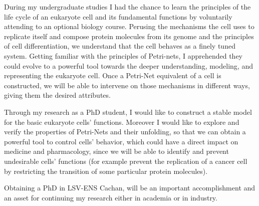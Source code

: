 \documentclass[a4paper,12pt]{article}
\begin{document}
\par{During my undergraduate studies I had the chance to learn the principles of the life cycle of an eukaryote cell and its fundamental functions by voluntarily attending to an optional biology course. Perusing the mechanisms the cell uses to replicate itself and compose protein molecules from its genome and the principles of cell differentiation, we understand that the cell behaves as a finely tuned system. Getting familiar with the principles of Petri-nets, I apprehended they could evolve to a powerful tool towards the deeper understanding, modeling, and representing the eukaryote cell. Once a Petri-Net equivalent of a cell is constructed, we will be able to intervene on those mechanisms in different ways, giving them the desired attributes.}
\par{Through my research as a PhD student, I would like to construct a stable model for the basic eukaryote cells’ functions. Moreover I would like to explore and verify the properties of Petri-Nets and their unfolding, so that we can obtain a powerful tool to control cells’ behavior, which could have a direct impact on medicine and pharmacology, since we will be able to identify and prevent undesirable cells’ functions (for example prevent the replication of a cancer cell by restricting the transition of some particular protein molecules).}
\par{Obtaining a PhD in LSV-ENS Cachan, will be an important accomplishment and an asset for continuing my research either in academia or in industry.}
\end{document}
